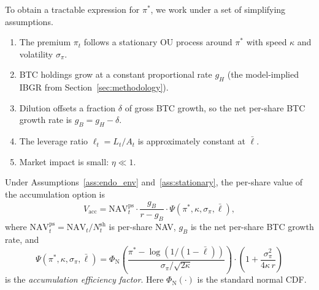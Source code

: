 To obtain a tractable expression for $\pi^*$, we work under a set of
simplifying assumptions.

\begin{assumption}\label{ass:stationary}
\begin{enumerate}
  \item The premium $\pi_t$ follows a stationary OU process around $\pi^*$
    with speed $\kappa$ and volatility $\sigma_\pi$.
  \item BTC holdings grow at a constant proportional rate $g_H$ (the
    model-implied IBGR from Section~\ref{sec:methodology}).
  \item Dilution offsets a fraction $\delta$ of gross BTC growth, so the
    net per-share BTC growth rate is $g_B = g_H - \delta$.
  \item The leverage ratio $\ell_t = L_t / A_t$ is approximately constant
    at $\bar{\ell}$.
  \item Market impact is small: $\eta \ll 1$.
\end{enumerate}
\end{assumption}

\begin{proposition}\label{prop:accretion_value}
Under Assumptions~\ref{ass:endo_env} and~\ref{ass:stationary}, the
per-share value of the accumulation option is
\begin{equation}\label{eq:V_acc_closed}
  V_{\mathrm{acc}} = \mathrm{NAV}_t^{\mathrm{ps}} \cdot
  \frac{g_B}{r - g_B} \cdot
  \Psi(\pi^*, \kappa, \sigma_\pi, \bar{\ell}),
\end{equation}
where $\mathrm{NAV}_t^{\mathrm{ps}} = \mathrm{NAV}_t / N_t^{\mathrm{sh}}$
is per-share NAV, $g_B$ is the net per-share BTC growth rate, and
\begin{equation}\label{eq:Psi}
  \Psi(\pi^*, \kappa, \sigma_\pi, \bar\ell) =
  \Phi_{\mathrm{N}}\!\left(
    \frac{\pi^* - \log(1/(1-\bar\ell))}{\sigma_\pi / \sqrt{2\kappa}}
  \right)
  \cdot \left(1 + \frac{\sigma_\pi^2}{4\kappa\, r}\right)
\end{equation}
is the \emph{accumulation efficiency factor}.  Here
$\Phi_{\mathrm{N}}(\cdot)$ is the standard normal CDF.
\end{proposition}

